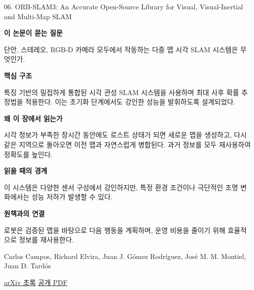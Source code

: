 \documentclass[11pt,openany]{book}
\begin{document}
\begin{termcard}{06. ORB-SLAM3: An Accurate Open-Source Library for Visual, Visual-Inertial and Multi-Map SLAM}

\par

\medskip

{\sffamily\bfseries\color{deepblue} 이 논문이 묻는 질문}\par

단안, 스테레오, RGB-D 카메라 모두에서 작동하는 다중 맵 시각 SLAM 시스템은 무엇인가.

\smallskip

{\sffamily\bfseries\color{deepblue} 핵심 구조}\par

특징 기반의 밀접하게 통합된 시각 관성 SLAM 시스템을 사용하며 최대 사후 확률 추정법을 적용한다. 이는 초기화 단계에서도 강인한 성능을 발휘하도록 설계되었다.

\smallskip

{\sffamily\bfseries\color{deepblue} 왜 이 장에서 읽는가}\par

시각 정보가 부족한 장시간 동안에도 로스트 상태가 되면 새로운 맵을 생성하고, 다시 같은 지역으로 돌아오면 이전 맵과 자연스럽게 병합된다. 과거 정보를 모두 재사용하여 정확도를 높인다.

\smallskip

{\sffamily\bfseries\color{coral} 읽을 때의 경계}\par

이 시스템은 다양한 센서 구성에서 강인하지만, 특정 환경 조건이나 극단적인 조명 변화에서는 성능 저하가 발생할 수 있다.

\smallskip

{\sffamily\bfseries\color{teal} 원책과의 연결}\par

로봇은 검증된 맵을 바탕으로 다음 행동을 계획하며, 운영 비용을 줄이기 위해 효율적으로 정보를 재사용한다.

\medskip

{\footnotesize\color{muted} Carlos Campos, Richard Elvira, Juan J. Gómez Rodríguez, José M. M. Montiel, Juan D. Tardós\par

\href{https://arxiv.org/abs/2007.11898}{arXiv 초록} \quad \href{https://arxiv.org/pdf/2007.11898}{공개 PDF}\par}

\end{termcard}
\end{document}
